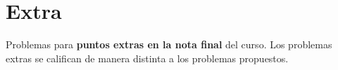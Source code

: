 \section{Extra}

Problemas para \textbf{puntos extras en la nota final} del curso.
Los problemas extras se califican de manera distinta a los problemas propuestos.